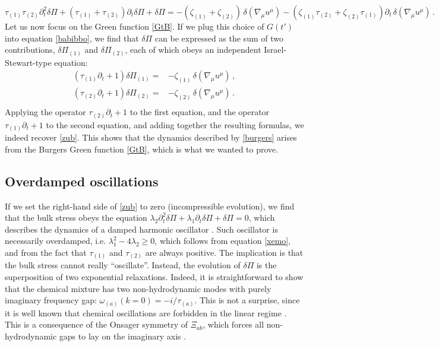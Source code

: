 \documentclass[a4paper, amsfonts, amssymb, amsmath, reprint, showkeys, nofootinbib, twoside, onecolumn,notitlepage]{revtex4-1}
\begin{document}
\begin{equation}\label{zub}
\tau_{(1)}\tau_{(2)}\partial^2_t \delta \Pi +(\tau_{(1)}+\tau_{(2)})\partial_t \delta \Pi +\delta \Pi = -(\zeta_{(1)}+\zeta_{(2)}) \, \delta(\nabla_\mu  u^\mu)-(\zeta_{(1)}\tau_{(2)}+\zeta_{(2)}\tau_{(1)})\partial_t  \, \delta(\nabla_\mu  u^\mu) \, .
\end{equation}
Let us now focus on the Green function \eqref{GtB}. If we plug this choice of $G(t')$ into equation \eqref{babibbo}, we find that $\delta\Pi$ can be expressed as the sum of two contributions, $\delta\Pi_{(1)}$ and $\delta\Pi_{(2)}$, each of which obeys an independent Israel-Stewart-type equation:
\begin{equation}
\begin{split}
(\tau_{(1)}\partial_t +1)\delta\Pi_{(1)}={}& -\zeta_{(1)} \, \delta(\nabla_\mu  u^\mu) \, ,\\
(\tau_{(2)}\partial_t +1)\delta\Pi_{(2)}={}& -\zeta_{(2)} \, \delta(\nabla_\mu  u^\mu) \, .\\
\end{split}
\end{equation}
Applying the operator $\tau_{(2)}\partial_t+1$ to the first equation, and the operator $\tau_{(1)}\partial_t+1$ to the second equation, and adding together the resulting formulas, we indeed recover \eqref{zub}. This shows that the dynamics described by \eqref{burgers} arises from the Burgers Green function \eqref{GtB}, which is what we wanted to prove.

\subsection{Overdamped oscillations}

If we set the right-hand side of \eqref{zub} to zero (incompressible evolution), we find that the bulk stress obeys the equation $\lambda_2 \partial^2_t \delta \Pi + \lambda_1 \partial_t \delta \Pi+\delta \Pi=0$, which describes the dynamics of a damped harmonic oscillator \cite{Denicol_Relaxation_2011}. Such oscillator is necessarily overdamped, i.e. $\lambda_1^2-4\lambda_2 \geq 0$, which follows from equation \eqref{xemo}, and from the fact that $\tau_{(1)}$ and $\tau_{(2)}$ are always positive. The implication is that the bulk stress cannot really ``oscillate''. Instead, the evolution of $\delta \Pi$ is the superposition of two exponential relaxations. Indeed, it is straightforward to show that the chemical mixture has two non-hydrodynamic modes with purely imaginary frequency gap: $\omega_{(a)}(k=0)=-i/\tau_{(a)}$. This is not a surprise, since it is well known that chemical oscillations are forbidden in the linear regime \cite{Yongefeng2008}. This is a consequence of the Onsager symmetry of $\Xi_{ab}$, which forces all non-hydrodynamic gaps to lay on the imaginary axis \cite{GavassinoNonHydro2022}.
\end{document}
